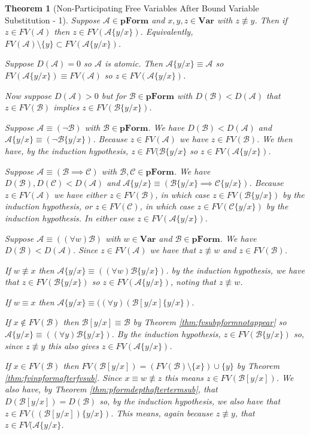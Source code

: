 \documentclass[12pt]{article}
\theoremstyle{break}
\theoremstyle{break}
\newtheorem{theorem}{Theorem}[section]
\theoremstyle{break}
\theoremstyle{break}
\theoremstyle{break}
\newtheorem{informal definition}[definition]{Informal Definition}
\newcommand{\mc}[1]{\mathcal{#1}}
\begin{document}
\begin{theorem}[Non-Participating Free Variables After Bound Variable Substitution - 1]
Suppose $\mc{A}\in\textbf{pForm}$ and $x, y, z \in\textbf{Var}$ with $z\not \equiv y$.
Then if $z\in FV(\mc{A})$ then $z\in FV(\mc{A}\{y/x\})$.
Equivalently, $FV(\mc{A})\setminus\{y\} \subset FV(\mc{A}\{y/x\})$.

Suppose $D(\mc{A})=0$ so $\mc{A}$ is atomic.
Then $\mc{A}\{y/x\} \equiv \mc{A}$ so $FV(\mc{A}\{y/x\}) \equiv FV(\mc{A})$ so $z\in FV(\mc{A}\{y/x\})$.

Now suppose $D(\mc{A}) > 0$ but for $\mc{B}\in\textbf{pForm}$ with $D(\mc{B}) < D(\mc{A})$ that $z\in FV(\mc{B})$ implies $z\in FV(\mc{B}\{y/x\})$.

Suppose $\mc{A}\equiv (\lnot \mc{B})$ with $\mc{B}\in\textbf{pForm}$.
We have $D(\mc{B})<D(\mc{A})$ and $\mc{A}\{y/x\} \equiv (\lnot \mc{B}\{y/x\})$.
Because $z\in FV(\mc{A})$ we have $z\in FV(\mc{B})$.
We then have, by the induction hypothesis, $z\in FV(\mc{B}\{y/x\}$ so $z\in FV(\mc{A}\{y/x\})$.

Suppose $\mc{A}\equiv(\mc{B}\implies \mc{C})$ with $\mc{B}, \mc{C}\in \textbf{pForm}$.
We have $D(\mc{B}), D(\mc{C}) < D(\mc{A})$ and $\mc{A}\{y/x\} \equiv (\mc{B}\{y/x\} \implies \mc{C}\{y/x\})$.
Because $z \in FV(\mc{A})$ we have either $z\in FV(\mc{B})$, in which case $z\in FV(\mc{B}\{y/x\})$ by the induction hypothesis, or $z\in FV(\mc{C})$, in which case $z\in FV(\mc{C}\{y/x\})$ by the induction hypothesis.
In either case $z\in FV(\mc{A}\{y/x\})$.

Suppose $\mc{A}\equiv ((\forall w)\mc{B})$ with $w\in\textbf{Var}$ and $\mc{B}\in\textbf{pForm}$.
We have $D(\mc{B}) < D(\mc{A})$.
Since $z\in FV(\mc{A})$ we have that $z \not \equiv w$ and $z\in FV(\mc{B})$.

If $w\not \equiv x$ then $\mc{A}\{y/x\} \equiv ((\forall w)\mc{B}\{y/x\})$.
by the induction hypothesis, we have that $z\in FV(\mc{B}\{y/x\})$ so $z\in FV(\mc{A}\{y/x\})$, noting that $z\not \equiv w$.

If $w \equiv x$ then $\mc{A}\{y/x\} \equiv ((\forall y) (\mc{B}[y/x]\{y/x\})$.

If $x\not \in FV(\mc{B})$ then $\mc{B}[y/x] \equiv \mc{B}$ by Theorem \ref{thm:fvsubpformnotappear} so $\mc{A}\{y/x\} \equiv ((\forall y) \mc{B}\{y/x\})$.
By the induction hypothesis, $z\in FV(\mc{B}\{y/x\})$ so, since $z\not \equiv y$ this also gives $z\in FV(\mc{A}\{y/x\})$.

If $x\in FV(\mc{B})$ then $FV(\mc{B}[y/x]) = (FV(\mc{B})\setminus\{x\})\cup\{y\}$ by Theorem \ref{thm:fvinpformafterfvsub}.
Since $x \equiv w \not \equiv z$ this means $z\in FV(\mc{B}[y/x])$.
We also have, by Theorem \ref{thm:pformdepthaftertermsub}, that $D(\mc{B}[y/x]) = D(\mc{B})$ so, by the induction hypothesis, we also have that $z\in FV((\mc{B}[y/x])\{y/x\})$.
This means, again because $z \not \equiv y$, that $z\in FV(\mc{A}\{y/x\}$.
\end{theorem}
\end{document}
